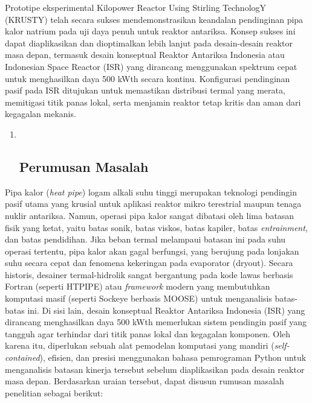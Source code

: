 \documentclass[
]{article}
\begin{document}
Prototipe eksperimental Kilopower Reactor Using Stirling TechnologY
(KRUSTY) telah secara sukses mendemonstrasikan keandalan pendinginan
pipa kalor natrium pada uji daya penuh untuk reaktor antariksa. Konsep
sukses ini dapat diaplikasikan dan dioptimalkan lebih lanjut pada
desain-desain reaktor masa depan, termasuk desain konseptual Reaktor
Antariksa Indonesia atau Indonesian Space Reactor (ISR) yang dirancang
menggunakan spektrum cepat untuk menghasilkan daya 500 kWth secara
kontinu. Konfigurasi pendinginan pasif pada ISR ditujukan untuk
memastikan distribusi termal yang merata, memitigasi titik panas lokal,
serta menjamin reaktor tetap kritis dan aman dari kegagalan mekanis.

\begin{enumerate}
\def\labelenumi{\arabic{enumi}.}
\setcounter{enumi}{1}
\item ~
  \subsection{\texorpdfstring{\textbf{Perumusan
  Masalah}}{Perumusan Masalah}}\label{perumusan-masalah}
\end{enumerate}

Pipa kalor (\emph{heat pipe}) logam alkali suhu tinggi merupakan
teknologi pendingin pasif utama yang krusial untuk aplikasi reaktor
mikro terestrial maupun tenaga nuklir antariksa. Namun, operasi pipa
kalor sangat dibatasi oleh lima batasan fisik yang ketat, yaitu batas
sonik, batas viskos, batas kapiler, batas \emph{entrainment}, dan batas
pendidihan. Jika beban termal melampaui batasan ini pada suhu operasi
tertentu, pipa kalor akan gagal berfungsi, yang berujung pada lonjakan
suhu secara cepat dan fenomena kekeringan pada evaporator (dryout).
Secara historis, desainer termal-hidrolik sangat bergantung pada kode
lawas berbasis Fortran (seperti HTPIPE) atau \emph{framework} modern
yang membutuhkan komputasi masif (seperti Sockeye berbasis MOOSE) untuk
menganalisis batas-batas ini. Di sisi lain, desain konseptual Reaktor
Antariksa Indonesia (ISR) yang dirancang menghasilkan daya 500 kWth
memerlukan sistem pendingin pasif yang tangguh agar terhindar dari titik
panas lokal dan kegagalan komponen. Oleh karena itu, diperlukan sebuah
alat pemodelan komputasi yang mandiri (\emph{self-contained}), efisien,
dan presisi menggunakan bahasa pemrograman Python untuk menganalisis
batasan kinerja tersebut sebelum diaplikasikan pada desain reaktor masa
depan. Berdasarkan uraian tersebut, dapat disusun rumusan masalah
penelitian sebagai berikut:
\end{document}
